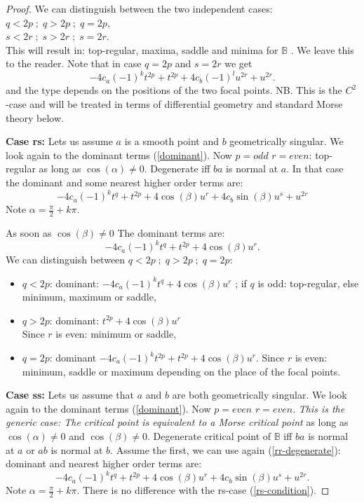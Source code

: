 \documentclass[10pt,a4paper]{amsart}
\begin{document}
\begin{proof}
We can distinguish between  the two independent cases:\\
$q < 2p \; ; \; q > 2p \; ; \; q = 2p$,\\
$s < 2r \; ; \; s > 2r \; ; \; s = 2r$.\\
This will result in: top-regular, maxima, saddle and minima for $\mathbb{B}$ . We leave this to the reader.
Note that in case $q=2p$ and $s=2r$ we get
\begin{equation}\label{rr-degenerate}
  -4 c_a (-1)^k t^{2p} +t^{2 p} +4 c_b (-1)^l u^{2r}+u^{2 r}.
\end{equation}
and the type depends on the positions of the two focal points. 
NB. This is the $C^2$-case and will be treated in terms of differential geometry and standard Morse theory below.

{\bf Case rs: } Lets us assume $a$ is a  smooth point and $b$ geometrically singular. We look again to the dominant terms (\ref{dominant}). Now $p = odd$ $r= even$: top-regular as long as $\cos(\alpha) \ne 0$.  Degenerate iff $ba$ is normal at $a$. In that case
the dominant and some nearest higher order terms are:
\begin{equation}\label{rs-condition}
  -4 c_a (-1)^k t^q +t^{2 p} +4 \cos (\beta ) u^r   +4 c_b \sin (\beta ) u^s+u^{2 r}
\end{equation}
Note $  \alpha = \frac{\pi}{2} + k \pi.$ 

As soon as $\cos (\beta) \ne 0$ The dominant terms are:
$$  -4 c_a (-1)^k t^q +t^{2 p} +4 \cos (\beta ) u^r.  $$
We can distinguish between
$q < 2p \; ; \; q > 2p \; ; \; q = 2p$:
\begin{itemize}
\item $q < 2p$: dominant: $-4 c_a (-1)^k  t^q +4  \cos(\beta ) u^r$ ; if $q$ is odd: top-regular, else minimum, maximum or saddle,
\item $q > 2p$: dominant: $ t^{2 p} +4 \cos (\beta ) u^r  $ \\
Since $r$ is even: minimum or saddle,
\item $q =2p$: dominant $  -4 c_a (-1)^k t^{2p} +t^{2 p} +4 \cos (\beta ) u^r  $.
 Since $r$ is  even: minimum, saddle or maximum depending on the  place of the focal points.
\end{itemize}




{\bf Case ss:}   
 Lets us assume that  $a$  and $b$ are both geometrically singular. We look again to the dominant terms (\ref{dominant}). Now $p = even$ $r=even$. \textit{This is the generic case: The critical point is equivalent to a Morse critical point} as long as $\cos(\alpha) \ne 0$  and  $\cos(\beta) \ne 0$. Degenerate critical point of $\mathbb{B}$ iff $ba$ is normal at $a$ or $ab$ is normal at $b$. Assume the first, we can use again (\ref{rr-degenerate}):
dominant and nearest higher order terms are:
\begin{equation}
  -4 c_a (-1)^k t^q +t^{2 p} +4 \cos (\beta ) u^r +4 c_b \sin (\beta ) u^s+u^{2 r}.
\end{equation}
Note $  \alpha = \frac{\pi}{2} + k \pi.$ 
There is no difference with the  rs-case (\ref{rs-condition}).



\end{proof}
\end{document}
